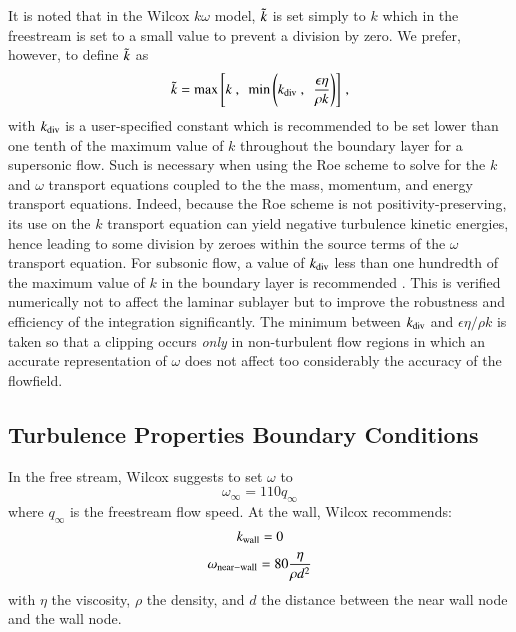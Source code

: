 \documentclass{warpdoc}
\newcommand{\visc}{\eta}
\begin{document}
%
It is noted that in the Wilcox $k\omega$ model, $\tilde{k}$ is
set simply to $k$ which in the freestream is set to a small
value to prevent a division by zero. We prefer, however,  to define $\tilde{k}$ as
%
\begin{equation}
  \wtilde{k}={\rm max}\left[ k ~,~~\min \left(k_{\rm div}~,
                 ~~\frac{\epsilon \visc} {\rho k}\right)\right] \, ,
  \label{eqn:ktilde}
\end{equation}
%
with $k_{\rm div}$ is a user-specified constant which is recommended to be set lower than
one tenth of the maximum value of $k$ throughout the boundary layer for a supersonic flow. Such is necessary when using the Roe scheme to solve for the $k$ and $\omega$ transport equations coupled to the the mass, momentum, and energy transport equations. Indeed, because the Roe scheme is not positivity-preserving, its use on the $k$ transport equation can yield negative turbulence kinetic energies, hence leading to some division by zeroes within the source terms of the $\omega$ transport equation.  
For subsonic flow, a value of $k_{\rm div}$ less than one hundredth of the maximum
value of $k$ in the boundary layer is recommended \cite{aiaa:2002:parent}. This is
verified numerically not to affect the laminar sublayer
but to improve the robustness and efficiency of the integration significantly.
The minimum between $k_{\rm div}$ and $\epsilon \visc / \rho k$ is taken so that a
clipping occurs \emph{only} in non-turbulent flow regions in which an accurate
representation of $\omega$ does not affect too considerably the accuracy of the flowfield.


\subsection{Turbulence Properties Boundary Conditions}

In the free stream, Wilcox \cite{aiaa:2008:wilcox} suggests to set $\omega$ to 
%
\begin{equation}
  \omega_\infty=110 q_\infty
\end{equation}
%
where $q_\infty$ is the freestream flow speed.
At the wall, Wilcox recommends:
%
\begin{equation}
k_{\rm wall}=0
\end{equation}
%
\begin{equation}
\omega_{\rm near-wall}=80\frac{\eta}{\rho d^2}
\end{equation}
%
with $\eta$ the viscosity, $\rho$ the density, and $d$ the distance between the near wall node and the wall node.
\end{document}
